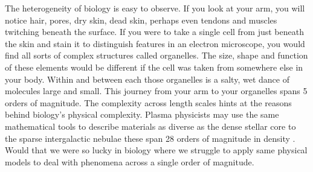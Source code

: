 The heterogeneity of biology is easy to observe. If you look at your arm, you will notice hair, pores, dry skin, dead skin, perhaps even tendons and muscles twitching beneath the surface. If you were to take a single cell from just beneath the skin and stain it to distinguish features in an electron microscope, you would find all sorts of complex structures called organelles. The size, shape and function of these elements would be different if the cell was taken from somewhere else in your body. Within and between each those organelles is a salty, wet dance of molecules large and small. This journey from your arm to your organelles spans 5 orders of magnitude. The complexity across length scales hints at the reasons behind biology's physical complexity. Plasma physicists may use the same mathematical tools to describe materials as diverse as the dense stellar core to the sparse intergalactic nebulae these span 28 orders of magnitude in density \cite{chen2018}. Would that we were so lucky in biology where we struggle to apply same physical models to deal with phenomena across a single order of magnitude.  
